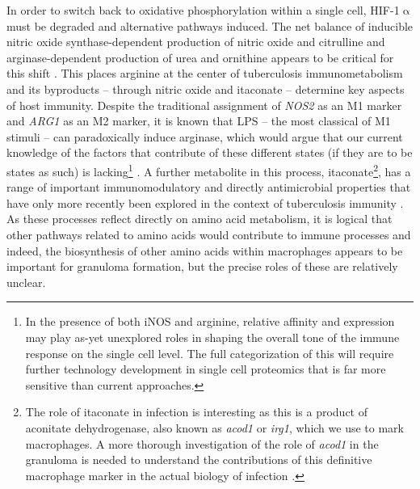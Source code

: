 In order to switch back to oxidative phosphorylation within a single cell, HIF\hyp{}1$\upalpha$ must be degraded and alternative pathways induced. The net balance of inducible nitric oxide synthase\hyp{}dependent production of nitric oxide and citrulline and arginase\hyp{}dependent production of urea and ornithine appears to be critical for this shift \citep{Qualls2016, Palmieri2020}. This places arginine at the center of tuberculosis immunometabolism and its byproducts -- through nitric oxide and itaconate -- determine key aspects of host immunity. Despite the traditional assignment of \textit{NOS2} as an M1 marker and \textit{ARG1} as an M2 marker, it is known that LPS -- the most classical of M1 stimuli -- can paradoxically induce arginase, which would argue that our current knowledge of the factors that contribute of these different states (if they are to be states as such) is lacking\footnote{In the presence of both iNOS and arginine, relative affinity and expression may play as\hyp{}yet unexplored roles in shaping the overall tone of the immune response on the single cell level. The full categorization of this will require further technology development in single cell proteomics that is far more sensitive than current approaches.} \citep{ElKasmi2008}. A further metabolite in this process, itaconate\footnote{The role of itaconate in infection is interesting as this is a product of aconitate dehydrogenase, also known as \textit{acod1} or \textit{irg1}, which we use to mark macrophages. A more thorough investigation of the role of \textit{acod1} in the granuloma is needed to understand the contributions of this definitive macrophage marker in the actual biology of infection \citep{Nair2018}.}, has a range of important immunomodulatory and directly antimicrobial properties that have only more recently been explored in the context of tuberculosis immunity \citep{He2021, Jinich2022}. As these processes reflect directly on amino acid metabolism, it is logical that other pathways related to amino acids would contribute to immune processes and indeed, the biosynthesis of other amino acids within macrophages appears to be important for granuloma formation, but the precise roles of these are relatively unclear.

